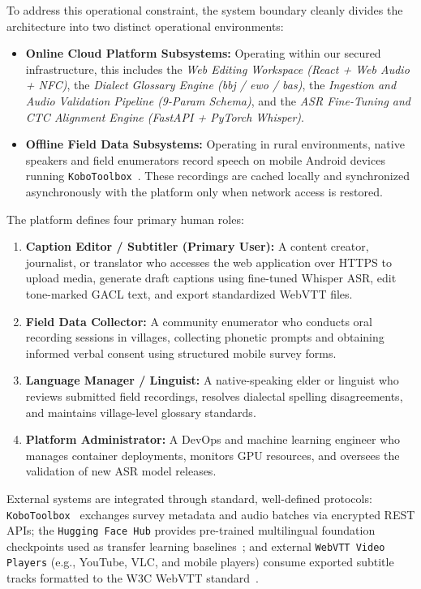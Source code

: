 \documentclass[a4paper,11pt]{article}
\begin{document}
To address this operational constraint, the system boundary cleanly divides the architecture into two distinct operational environments:
\begin{itemize}
    \item \textbf{Online Cloud Platform Subsystems:} Operating within our secured infrastructure, this includes the \textit{Web Editing Workspace (React + Web Audio + NFC)}, the \textit{Dialect Glossary Engine (bbj / ewo / bas)}, the \textit{Ingestion and Audio Validation Pipeline (9-Param Schema)}, and the \textit{ASR Fine-Tuning and CTC Alignment Engine (FastAPI + PyTorch Whisper)}.
    \item \textbf{Offline Field Data Subsystems:} Operating in rural environments, native speakers and field enumerators record speech on mobile Android devices running \texttt{KoboToolbox}~\cite{kobotoolbox2024}. These recordings are cached locally and synchronized asynchronously with the platform only when network access is restored.
\end{itemize}

The platform defines four primary human roles:
\begin{enumerate}
    \item \textbf{Caption Editor / Subtitler (Primary User):} A content creator, journalist, or translator who accesses the web application over HTTPS to upload media, generate draft captions using fine-tuned Whisper ASR, edit tone-marked GACL text, and export standardized WebVTT files.
    \item \textbf{Field Data Collector:} A community enumerator who conducts oral recording sessions in villages, collecting phonetic prompts and obtaining informed verbal consent using structured mobile survey forms.
    \item \textbf{Language Manager / Linguist:} A native-speaking elder or linguist who reviews submitted field recordings, resolves dialectal spelling disagreements, and maintains village-level glossary standards.
    \item \textbf{Platform Administrator:} A DevOps and machine learning engineer who manages container deployments, monitors GPU resources, and oversees the validation of new ASR model releases.
\end{enumerate}

External systems are integrated through standard, well-defined protocols: \texttt{KoboToolbox}~\cite{kobotoolbox2024} exchanges survey metadata and audio batches via encrypted REST APIs; the \texttt{Hugging Face Hub} provides pre-trained multilingual foundation checkpoints used as transfer learning baselines~\cite{conneau2023fleurs}; and external \texttt{WebVTT Video Players} (e.g., YouTube, VLC, and mobile players) consume exported subtitle tracks formatted to the W3C WebVTT standard~\cite{w3c2019webvtt}.
\end{document}
